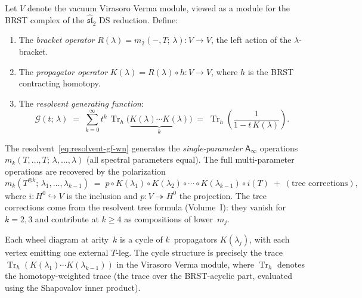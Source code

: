 \documentclass[11pt]{article}
\newcommand{\Ainf}{\mathsf{A}_{\infty}}
\newcommand{\Tr}{\operatorname{Tr}}
\begin{document}
\begin{definition}
\label{def:vir-resolvent-wn}
Let $V$ denote the vacuum Virasoro Verma module, viewed as a
module for the BRST complex of the
$\widehat{\mathfrak{sl}}_2$ DS reduction.
Define:
\begin{enumerate}[label=\textup{(\roman*)},nosep]
\item The \emph{bracket operator}
  $R(\lambda) = m_2(-, T;\, \lambda) \colon V \to V$,
  the left action of the $\lambda$-bracket.
\item The \emph{propagator operator}
  $K(\lambda) = R(\lambda) \circ h \colon V \to V$,
  where $h$ is the BRST contracting homotopy.
\item The \emph{resolvent generating function}:
\begin{equation}\label{eq:resolvent-gf-wn}
\mathcal{G}(t;\, \lambda)
\;=\;
\sum_{k=0}^{\infty} t^k\,
\Tr_h\!\bigl(\underbrace{K(\lambda) \cdots K(\lambda)}_{k}\bigr)
\;=\;
\Tr_h\!\left(\frac{1}{1 - t\,K(\lambda)}\right).
\end{equation}
\end{enumerate}
\end{definition}

The resolvent~\eqref{eq:resolvent-gf-wn} generates the
\emph{single-parameter} $\Ainf$ operations
$m_k(T, \ldots, T;\, \lambda, \ldots, \lambda)$
(all spectral parameters equal).  The full multi-parameter
operations are recovered by the polarization
\begin{equation}\label{eq:resolvent-polarization-wn}
m_k(T^{\otimes k};\, \lambda_1, \ldots, \lambda_{k-1})
\;=\;
p \circ K(\lambda_1) \circ K(\lambda_2) \circ \cdots
\circ K(\lambda_{k-1}) \circ i(T)
\;+\;
(\text{tree corrections}),
\end{equation}
where $i \colon H^0 \hookrightarrow V$ is the inclusion and
$p \colon V \twoheadrightarrow H^0$ the projection.  The tree
corrections come from the resolvent tree formula (Volume~I):
they vanish for $k = 2, 3$ and contribute at $k \ge 4$ as
compositions of lower~$m_j$.

\begin{observation}\label{obs:wheel-trace-wn}
Each wheel diagram at arity~$k$ is a cycle of $k$~propagators
$K(\lambda_j)$, with each vertex emitting one external $T$-leg.
The cycle structure is precisely the trace
$\Tr_h(K(\lambda_1) \cdots K(\lambda_{k-1}))$
in the Virasoro Verma module, where $\Tr_h$ denotes the
homotopy-weighted trace (the trace over the BRST-acyclic part,
evaluated using the Shapovalov inner product).
\end{observation}
\end{document}
